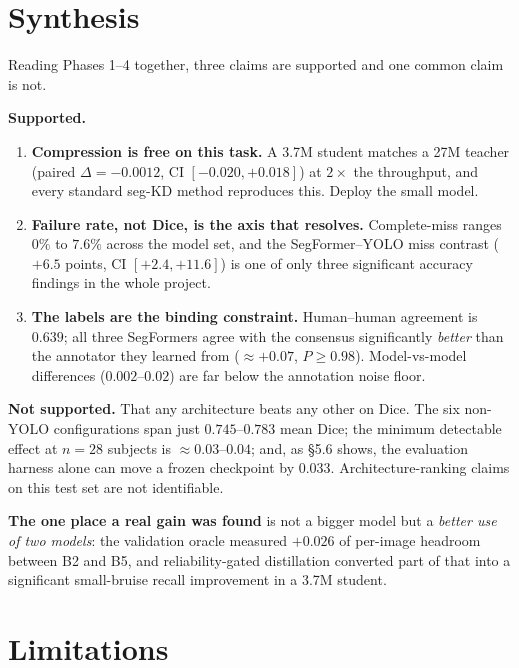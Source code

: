 \documentclass[11pt]{article}
\begin{document}
\section{Synthesis}

Reading Phases 1--4 together, three claims are supported and one common claim is not.

\textbf{Supported.}
\begin{enumerate}[leftmargin=1.6em,itemsep=2pt]
  \item \textbf{Compression is free on this task.} A 3.7M student matches a 27M teacher
  (paired $\Delta=-0.0012$, CI $[-0.020,+0.018]$) at $2\times$ the throughput, and every standard
  seg-KD method reproduces this. Deploy the small model.
  \item \textbf{Failure rate, not Dice, is the axis that resolves.} Complete-miss ranges $0\%$ to
  $7.6\%$ across the model set, and the SegFormer--YOLO miss contrast ($+6.5$ points, CI
  $[+2.4,+11.6]$) is one of only three significant accuracy findings in the whole project.
  \item \textbf{The labels are the binding constraint.} Human--human agreement is $0.639$; all
  three SegFormers agree with the consensus significantly \emph{better} than the annotator they
  learned from ($\approx+0.07$, $P\ge0.98$). Model-vs-model differences ($0.002$--$0.02$) are far
  below the annotation noise floor.
\end{enumerate}

\textbf{Not supported.} That any architecture beats any other on Dice. The six
non-YOLO configurations span just $0.745$--$0.783$ mean Dice; the minimum detectable effect at $n=28$ subjects is
$\approx0.03$--$0.04$; and, as \S5.6 shows, the evaluation harness alone can move a frozen
checkpoint by $0.033$. Architecture-ranking claims on this test set are not identifiable.

\textbf{The one place a real gain was found} is not a bigger model but a \emph{better use of two
models}: the validation oracle measured $+0.026$ of per-image headroom between B2 and B5, and
reliability-gated distillation converted part of that into a significant small-bruise recall
improvement in a 3.7M student.

\section{Limitations}
\end{document}
